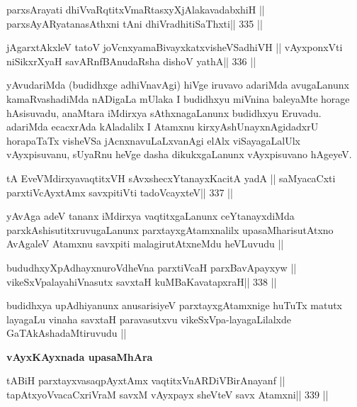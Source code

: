 \begin{shl}
parxsArayati dhiVvaRqtitxVmaRtasxyXjAlakavadabxhiH ||
parxsAyAR\s\s yatanasAthxni tAni dhiVradhitiSaThxti\hfill || 335 ||
\end{shl}

\begin{shl}
jAgarxtAkxleV tatoV joVcnx\s yamaBivayxkatxvisheVSadhiVH ||
vAyxponxVti niSikxrXyaH savARnfBAnudaRsha dishoV yathA\hfill || 336 ||
\end{shl}

\begin{artha}
yAvudariMda (budidhxge adhiVnavAgi) hiVge iruvavo adariMda avugaLanunx 
kamaRvashadiMda nADigaLa mUlaka I budidhxyu miVnina baleyaMte horage 
hAsisuvadu, anaMtara iMdirxya sAthxnagaLanunx budidhxyu Eruvadu. 
adariMda ecacxrAda kAladalilx I Atamxnu kirxyAshUnayxnAgidadxrU 
horapaTaTx visheVSa jAcnxnavuLaLxvanAgi elAlx viSayagaLalUlx 
vAyxpisuvanu, sUyaRnu heVge dasha dikukxgaLanunx vAyxpisuvano hAgeyeV.
\end{artha}

\begin{shl}
tA EveVMdirxyavaqtitxVH sAvxshecxYtanayxKacitA yadA ||
saMyacaCxti parxtiVcAyxtAmx savxpitiVti tadoVcayxteV\hfill || 337 ||
\end{shl}

\begin{artha}
yAvAga adeV tananx iMdirxya vaqtitxgaLanunx ceYtanayxdiMda parxkAshisutitxruvugaLanunx parxtayxgAtamxnalilx upasaMharisutAtxno AvAgaleV Atamxnu savxpiti malagirutAtxneMdu heVLuvudu ||
\end{artha}

\begin{shl}
bududhxyXpAdhayxnuroVdheVna parxtiVcaH parxBavApayxyw ||
vikeSxVpalayahiVnasutx savxtaH kuMBaKavatapxraH\hfill || 338 ||
\end{shl}

\begin{artha}
budidhxya upAdhiyanunx anusarisiyeV parxtayxgAtamxnige huTuTx matutx 
layagaLu vinaha savxtaH paravasutxvu vikeSxVpa-layagaLilalxde GaTAkAshadaMtiruvudu ||
\end{artha}

\begin{center}
{\bf vAyxKAyxnada upasaMhAra}
\end{center}

\begin{shl}
tABiH parxtayxvasaqpAyx\s\s tAmx vaqtitxVnARDiVBirAnayanf ||
\footnotemark[1]tapAtxyoVvacaCxriVraM savxM vAyxpayx sheVteV savx Atamxni\hfill || 339 ||
\end{shl}

